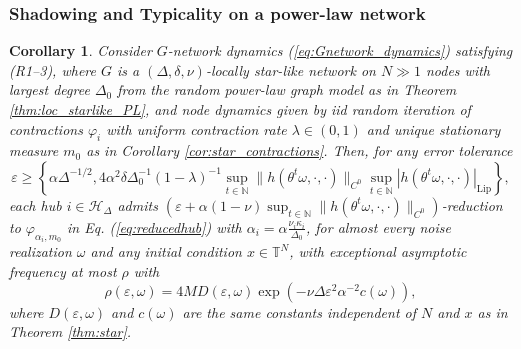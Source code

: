 \documentclass[a4paper]{article}
\theoremstyle{plain}
\newtheorem{corollary}[theorem]{Corollary}
\theoremstyle{definition}
\newcommand{\T}{\mathbb{T}}
\newcommand{\N}{\mathbb{N}}
\newcommand{\Hil}{\mathcal{H}}
\begin{document}
\subsubsection{Shadowing and Typicality on a power-law network}
%	
	
\begin{corollary}\label{cor:PL_contractions}
	Consider $G$-network dynamics (\ref{eq:Gnetwork_dynamics}) satisfying (R1--3), where $G$ is a $(\Delta,\delta,\nu)$-locally star-like network on $N\gg1$ nodes with largest degree $\Delta_0$ from the random power-law graph model as in Theorem \ref{thm:loc_starlike_PL}, and node dynamics given by iid random iteration of contractions $\varphi_i$ with uniform contraction rate $\lambda\in(0,1)$ and unique stationary measure $m_0$ as in Corollary \ref{cor:star_contractions}.
	Then, for any error tolerance 
	\[
	\varepsilon\geq \left\{\alpha\Delta^{-1/2},4\alpha^2 \delta\Delta_0^{-1} (1-\lambda)^{-1}\sup_{t\in\N} \|h(\theta^t\omega,\cdot,\cdot)\|_{C^0} \sup_{t\in\N } |h(\theta^t\omega,\cdot,\cdot)|_{\mathrm{Lip}}\right\},
	\]
	each hub $i\in\Hil_{\Delta}$ admits $(\varepsilon + \alpha(1-\nu)\sup_{t\in\N} \|h(\theta^t\omega,\cdot,\cdot)\|_{C^0})$-reduction to $\varphi_{\alpha_i,m_0}$ in Eq. (\ref{eq:reducedhub}) with $\alpha_i=\alpha\frac{\nu_i\kappa_i}{\Delta_0}$, for almost every noise realization $\omega$ and any initial condition $x\in\T^N$,
	with exceptional asymptotic frequency at most $\rho$ with  
	$$\rho(\varepsilon,\omega)= 4 MD(\varepsilon,\omega)\exp(-\nu\Delta\varepsilon^2 \alpha^{-2}c(\omega)),$$
	where $D(\varepsilon,\omega)$ and $c(\omega)$ are the same constants independent of $N$ and $x$ as in Theorem \ref{thm:star}.
\end{corollary}
\end{document}
